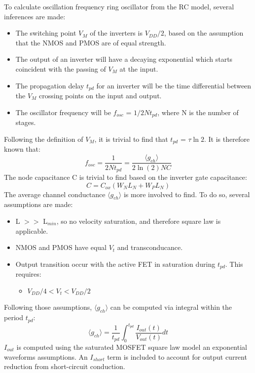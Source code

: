 \documentclass[10pt,a4paper]{article}
\begin{document}
	To calculate oscillation frequency ring oscillator from the RC model, several inferences are made:
	\begin{itemize}
		\item The switching point $V_M$ of the inverters is $V_{DD}/2$, based on the assumption that the NMOS and PMOS are of equal strength.
		\item The output of an inverter will have a decaying exponential which starts coincident with the passing of $V_M$ at the input.
		\item The propagation delay $t_{pd}$ for an inverter will be the time differential between the $V_M$ crossing points on the input and output.
		\item The oscillator frequency will be $f_{osc}$ = $1/2Nt_{pd}$, where N is the number of stages.
	\end{itemize}
	Following the definition of $V_M$, it is trivial to find that $t_{pd}$ = $\tau\ln2$. It is therefore known that:
	\begin{equation}
	f_{osc} = \frac{1}{2Nt_{pd}} = \frac{\langle g_{ch}\rangle}{2\ln(2)NC}
	\end{equation}
	The node capacitance C is trivial to find based on the inverter gate capacitance:
	\begin{equation}
		C = C_{ox}\left ( W_N L_N + W_P L_N \right)
	\end{equation}
	The average channel conductance $\langle g_{ch} \rangle$ is more involved to find. To do so, several assumptions are made:
	\begin{itemize}
		\item L $>>$ L$_{min}$, so no velocity saturation, and therefore square law is applicable.
		\item NMOS and PMOS have equal $V_t$ and transconducance.
		\item Output transition occur with the active FET in saturation during $t_{pd}$. This requires:
		\begin{itemize}
			\item $V_{DD}/4 < V_{t} < V_{DD}/2$
		\end{itemize}
	\end{itemize}
	Following those assumptions, $\langle g_{ch} \rangle$ can be computed via integral within the period $t_{pd}$:
	\begin{equation}
		\langle g_{ch} \rangle = \frac{1}{t_{pd}} \int_0^{t_{pd}}\frac{I_{out}(t)}{V_{out}(t)}dt
	\end{equation}
	$I_{out}$ is computed using the saturated MOSFET square law model an exponential waveforms assumptions. An $I_{short}$ term is included to account for output current reduction from short-circuit conduction.
\end{document}
